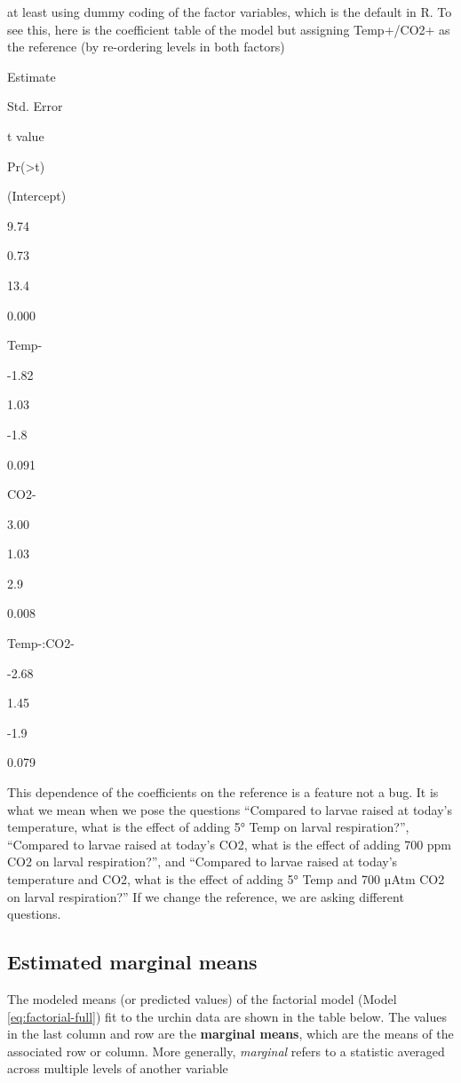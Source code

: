 \documentclass[]{book}
\begin{document}
at least using dummy coding of the factor variables, which is the default in R. To see this, here is the coefficient table of the model but assigning Temp+/CO2+ as the reference (by re-ordering levels in both factors)

Estimate

Std. Error

t value

Pr(\textgreater\textbar t\textbar)

(Intercept)

9.74

0.73

13.4

0.000

Temp-

-1.82

1.03

-1.8

0.091

CO2-

3.00

1.03

2.9

0.008

Temp-:CO2-

-2.68

1.45

-1.9

0.079

This dependence of the coefficients on the reference is a feature not a bug. It is what we mean when we pose the questions ``Compared to larvae raised at today's temperature, what is the effect of adding 5° Temp on larval respiration?'', ``Compared to larvae raised at today's CO2, what is the effect of adding 700 ppm CO2 on larval respiration?'', and ``Compared to larvae raised at today's temperature and CO2, what is the effect of adding 5° Temp and 700 µAtm CO2 on larval respiration?'' If we change the reference, we are asking different questions.

\hypertarget{estimated-marginal-means}{%
\subsection{Estimated marginal means}\label{estimated-marginal-means}}

The modeled means (or predicted values) of the factorial model (Model \eqref{eq:factorial-full}) fit to the urchin data are shown in the table below. The values in the last column and row are the \textbf{marginal means}, which are the means of the associated row or column. More generally, \emph{marginal} refers to a statistic averaged across multiple levels of another variable
\end{document}
